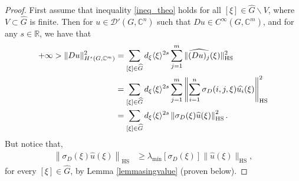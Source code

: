 \documentclass[11pt]{amsart}
\numberwithin{theorem}{section}
\numberwithin{equation}{section}
\theoremstyle{definition}
\numberwithin{example}{section}
\theoremstyle{definition}
\theoremstyle{definition}
\newcommand{\C}{\mathbb{C}}
\newcommand{\HS}{\operatorname{HS}}
\begin{document}
\begin{proof}
    First assume that inequality \eqref{ineq_theo} holds for all $[\xi]\in\widehat{G}\backslash V$, where $V\subset\widehat{G}$ is finite. Then for $u\in \mathcal{D}'(G,\C^n)$ such that $Du\in C^\infty(G,\C^m)$, and for any $s\in\mathbb{R}$, we have that
    \begin{align}\label{ineqprooftheovector1}
        +\infty>\|Du\|^2_{H^s(G,\C^m)} &= \sum_{[\xi]\in\widehat{G}}d_\xi\langle\xi\rangle^{2s} \sum_{j=1}^{m}\|\widehat{(Du)_j}(\xi)\|_{\HS}^2\notag\\
        &=\sum_{[\xi]\in\widehat{G}}d_\xi\langle\xi\rangle^{2s}\sum_{j=1}^{m}\left\|\sum_{i=1}^{n }\sigma_D(i,j,\xi)\widehat{u_i}(\xi)\right\|_{\HS}^2\notag \\
        &=\sum_{[\xi]\in\widehat{G}}d_\xi\langle\xi\rangle^{2s}\left\|\sigma_D(\xi)\widehat{u}(\xi)\right\|_{\HS}^2.
    \end{align}
        But notice that, 
        \begin{align*}
          \left\|\sigma_D(\xi)\widehat{u}(\xi)\right\|_{\HS}
           &\geq 
           \lambda_{\min}[\sigma_D(\xi)]\|\widehat{u}(\xi)\|_{\HS},
        \end{align*}
        for every $[\xi]\in\widehat{G}$, by Lemma \ref{lemmasingvalue} (proven below).

\end{proof}
\end{document}
